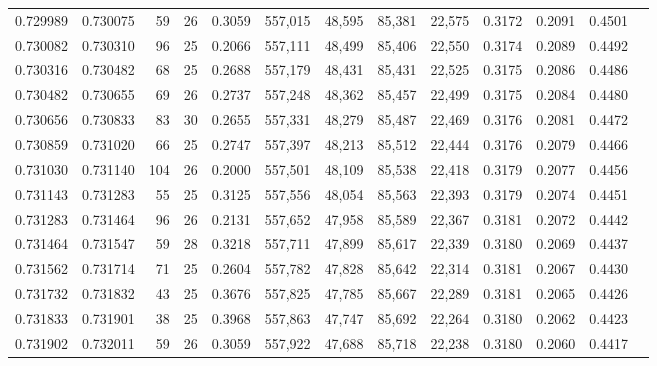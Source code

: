 \begin{tabular}{rrrrrrrrrrrrr}
0.729989 & 0.730075 &    59 &  26 &                                     0.3059 & 557,015 &  48,595 &  85,381 &  22,575 & 0.3172 & 0.2091 & 0.4501 \\
0.730082 & 0.730310 &    96 &  25 &                                     0.2066 & 557,111 &  48,499 &  85,406 &  22,550 & 0.3174 & 0.2089 & 0.4492 \\
0.730316 & 0.730482 &    68 &  25 &                                     0.2688 & 557,179 &  48,431 &  85,431 &  22,525 & 0.3175 & 0.2086 & 0.4486 \\
0.730482 & 0.730655 &    69 &  26 &                                     0.2737 & 557,248 &  48,362 &  85,457 &  22,499 & 0.3175 & 0.2084 & 0.4480 \\
0.730656 & 0.730833 &    83 &  30 &                                     0.2655 & 557,331 &  48,279 &  85,487 &  22,469 & 0.3176 & 0.2081 & 0.4472 \\
0.730859 & 0.731020 &    66 &  25 &                                     0.2747 & 557,397 &  48,213 &  85,512 &  22,444 & 0.3176 & 0.2079 & 0.4466 \\
0.731030 & 0.731140 &   104 &  26 &                                     0.2000 & 557,501 &  48,109 &  85,538 &  22,418 & 0.3179 & 0.2077 & 0.4456 \\
0.731143 & 0.731283 &    55 &  25 &                                     0.3125 & 557,556 &  48,054 &  85,563 &  22,393 & 0.3179 & 0.2074 & 0.4451 \\
0.731283 & 0.731464 &    96 &  26 &                                     0.2131 & 557,652 &  47,958 &  85,589 &  22,367 & 0.3181 & 0.2072 & 0.4442 \\
0.731464 & 0.731547 &    59 &  28 &                                     0.3218 & 557,711 &  47,899 &  85,617 &  22,339 & 0.3180 & 0.2069 & 0.4437 \\
0.731562 & 0.731714 &    71 &  25 &                                     0.2604 & 557,782 &  47,828 &  85,642 &  22,314 & 0.3181 & 0.2067 & 0.4430 \\
0.731732 & 0.731832 &    43 &  25 &                                     0.3676 & 557,825 &  47,785 &  85,667 &  22,289 & 0.3181 & 0.2065 & 0.4426 \\
0.731833 & 0.731901 &    38 &  25 &                                     0.3968 & 557,863 &  47,747 &  85,692 &  22,264 & 0.3180 & 0.2062 & 0.4423 \\
0.731902 & 0.732011 &    59 &  26 &                                     0.3059 & 557,922 &  47,688 &  85,718 &  22,238 & 0.3180 & 0.2060 & 0.4417 \\

\end{tabular}
